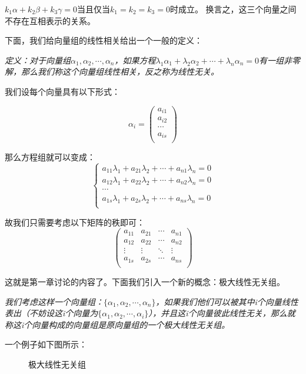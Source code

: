 \documentclass[a4paper]{ctexart}
\begin{document}
$k_1\alpha+k_2\beta+k_3\gamma=0$当且仅当$k_1=k_2=k_3=0$时成立。
换言之，这三个向量之间不存在互相表示的关系。

下面，我们给向量组的线性相关给出一个一般的定义：

\textit{定义：对于向量组$\alpha_1,\alpha_2,\cdots,\alpha_n$，如果方程$\lambda_1\alpha_1+\lambda_2\alpha_2+\cdots+\lambda_n\alpha_n=0$有一组非零解，那么我们称这个向量组线性相关，反之称为线性无关。}

我们设每个向量具有以下形式：

$$
\alpha_i=
\left(
\begin{array}{cccc}
a_{i1}\\
a_{i2}\\
\cdots \\
a_{is}\\
\end{array}
\right )
$$

那么方程组就可以变成：
$$
\begin{cases}
a_{11}\lambda_{1}+a_{21}\lambda_{2}+\cdots+a_{n1}\lambda_{n}=0\\
a_{12}\lambda_{1}+a_{22}\lambda_{2}+\cdots+a_{n2}\lambda_{n}=0\\
\cdots\\
a_{1s}\lambda_{1}+a_{2s}\lambda_{2}+\cdots+a_{ns}\lambda_{n}=0\\
\end{cases}
$$

故我们只需要考虑以下矩阵的秩即可：
$$
\begin{pmatrix}
a_{11}&a_{21}&\cdots&a_{n1}\\
a_{12}&a_{22}&\cdots&a_{n2}\\
\vdots&\vdots&\ddots&\vdots\\
a_{1s}&a_{2s}&\cdots&a_{ns}\\
\end{pmatrix}
$$

这就是第一章讨论的内容了。下面我们引入一个新的概念：极大线性无关组。

\textit{我们考虑这样一个向量组：$\{\alpha_1,\alpha_2,\cdots,\alpha_n\}$，如果我们他们可以被其中i个向量线性表出（不妨设这i个向量为$\{\alpha_1,\alpha_2,\cdots,\alpha_i\}$），并且这i个向量彼此线性无关，那么就称这i个向量构成的向量组是原向量组的一个极大线性无关组。}

一个例子如下图所示：

\begin{figure}[htp]
  \centering
  \caption{极大线性无关组}
\end{figure}
\end{document}
